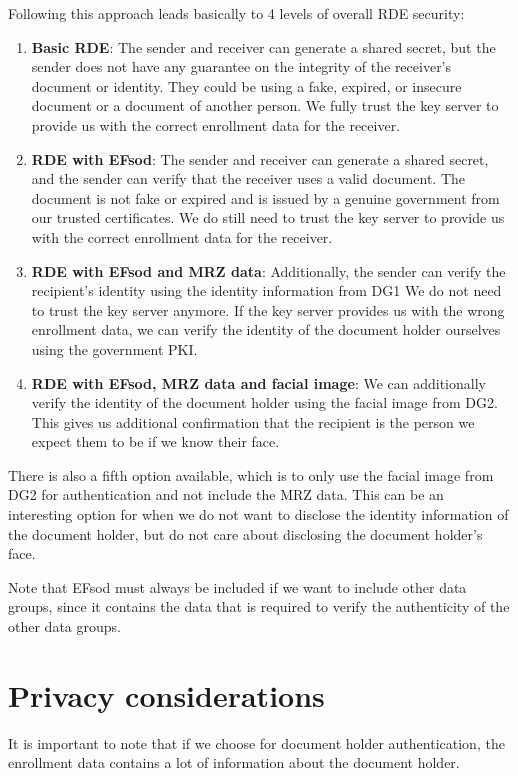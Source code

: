 Following this approach leads basically to 4 levels of overall RDE security:
\begin{enumerate}
    \item \textbf{Basic RDE}:
    The sender and receiver can generate a shared secret, but the sender does not have any guarantee on the integrity of the receiver's document or identity.
    They could be using a fake, expired, or insecure document or a document of another person.
    We fully trust the key server to provide us with the correct enrollment data for the receiver.
    \item \textbf{RDE with EFsod}:
    The sender and receiver can generate a shared secret, and the sender can verify that the receiver uses a valid document.
    The document is not fake or expired and is issued by a genuine government from our trusted certificates.
    We do still need to trust the key server to provide us with the correct enrollment data for the receiver.
    \item \textbf{RDE with EFsod and MRZ data}:
    Additionally, the sender can verify the recipient's identity using the identity information from DG1
    We do not need to trust the key server anymore.
    If the key server provides us with the wrong enrollment data, we can verify the identity of the document holder ourselves using the government PKI.
    \item \textbf{RDE with EFsod, MRZ data and facial image}:
    We can additionally verify the identity of the document holder using the facial image from DG2.
    This gives us additional confirmation that the recipient is the person we expect them to be if we know their face.
\end{enumerate}

There is also a fifth option available, which is to only use the facial image from DG2 for authentication and not include the MRZ data.
This can be an interesting option for when we do not want to disclose the identity information of the document holder, but do not care about disclosing the document holder's face.

Note that EFsod must always be included if we want to include other data groups, since it contains the data that is required to verify the authenticity of the other data groups.

\section{Privacy considerations}\label{sec:privacy-considerations}
It is important to note that if we choose for document holder authentication, the enrollment data contains a lot of information about the document holder.

